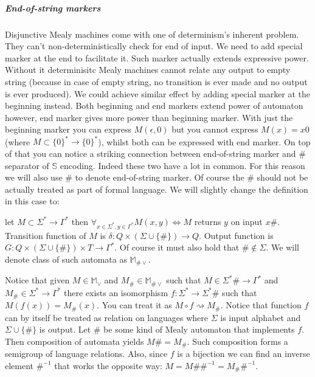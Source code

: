 \documentclass[12pt]{article}
\begin{document}
\begin{enumerate}
\end{enumerate}


\subparagraph{End-of-string markers} Disjunctive Mealy machines come with one of determinism's inherent problem. They can't non-deterministically check for end of input. We need to add special marker at the end to facilitate it. Such marker  actually extends expressive power. Without it determinisitc Mealy machines cannot relate any output to empty string (because in case of empty string, no transition is ever made and no output is ever produced). We could achieve similar effect by adding special marker at the beginning instead. Both beginning and end markers extend power of automaton however, end  marker gives more power than beginning marker. With just the beginning marker you can express $M(\epsilon,0)$ but you cannot express $M(x) = x0$ (where $M \subset \{0\}^* \rightarrow \{0\}^*$), whilst both can be expressed with end marker. On top of that you can notice a striking connection between end-of-string marker and $\#$ separator of $\mathbb{S}$ encoding. Indeed these two have a lot in common. For this reason we will also use $\#$ to denote end-of-string marker. Of course the $\#$ should not be actually treated as part  of formal language. We will slightly change the definition in this case to:


let $M\subset \Sigma^* \rightarrow \Gamma^*$ then $\forall_{x\in \Sigma^*,y\in\Gamma^*} M(x,y) \iff M$ returns $y$ on input $x\#$. Transition function of $M$ is $\delta : Q \times (\Sigma \cup \{\#\}) \rightarrow Q$. Output function is $G : Q \times (\Sigma \cup \{\#\}) \times T \rightarrow \Gamma^*$. Of course it must also hold that $\# \notin \Sigma$. We will denote class of such automata as $\mathbb{M}_{\#\vee}$.

Notice that given $M \in \mathbb{M}_\vee$ and $M_\# \in \mathbb{M}_{\#\vee}$ such that $M \in \Sigma^*\# \rightarrow \Gamma^*$ and $M_\# \in \Sigma^* \rightarrow \Gamma^*$ there exists an isomorphism $f : \Sigma^* \rightarrow \Sigma^*\#$ such that $M(f(x)) = M_\#(x)$. You can treat it as $M \circ f \rightsquigarrow M_\#$. Notice that function $f$ can by itself be treated as relation on languages where $\Sigma$ is input alphabet and $\Sigma\cup\{\#\}$ is output. Let $\#$ be some kind of Mealy automaton that implements $f$. Then composition of automata yields $M\# = M_\#$. Such composition forms a semigroup of language relations. Also, since $f$ is a bijection we can find an inverse element $\#^{-1}$ that works the opposite way:  $M = M\#\#^{-1} = M_\#\#^{-1}$.
\end{document}
